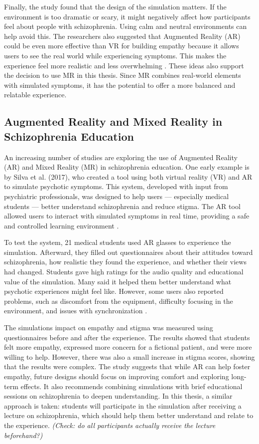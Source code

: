Finally, the study found that the design of the simulation matters. If the environment is too dramatic or scary, it might negatively affect how participants feel about people with schizophrenia. Using calm and neutral environments can help avoid this. The researchers also suggested that Augmented Reality (AR) could be even more effective than VR for building empathy because it allows users to see the real world while experiencing symptoms. This makes the experience feel more realistic and less overwhelming \cite{Zare-Bidaki2022}. These ideas also support the decision to use MR in this thesis. Since MR combines real-world elements with simulated symptoms, it has the potential to offer a more balanced and relatable experience.


\subsection{Augmented Reality and Mixed Reality in Schizophrenia Education}

An increasing number of studies are exploring the use of Augmented Reality (AR) and Mixed Reality (MR) in schizophrenia education. One early example is by Silva et al. (2017), who created a tool using both virtual reality (VR) and AR to simulate psychotic symptoms. This system, developed with input from psychiatric professionals, was designed to help users — especially medical students — better understand schizophrenia and reduce stigma. The AR tool allowed users to interact with simulated symptoms in real time, providing a safe and controlled learning environment \cite{Silva2017}.

To test the system, 21 medical students used AR glasses to experience the simulation. Afterward, they filled out questionnaires about their attitudes toward schizophrenia, how realistic they found the experience, and whether their views had changed. Students gave high ratings for the audio quality and educational value of the simulation. Many said it helped them better understand what psychotic experiences might feel like. However, some users also reported problems, such as discomfort from the equipment, difficulty focusing in the environment, and issues with synchronization \cite{Silva2017}.

The simulations impact on empathy and stigma was measured using questionnaires before and after the experience. The results showed that students felt more empathy, expressed more concern for a fictional patient, and were more willing to help. However, there was also a small increase in stigma scores, showing that the results were complex. The study suggests that while AR can help foster empathy, future designs should focus on improving comfort and exploring long-term effects. It also recommends combining simulations with brief educational sessions on schizophrenia to deepen understanding. In this thesis, a similar approach is taken: students will participate in the simulation after receiving a lecture on schizophrenia, which should help them better understand and relate to the experience. \emph{(Check: do all participants actually receive the lecture beforehand?)}


